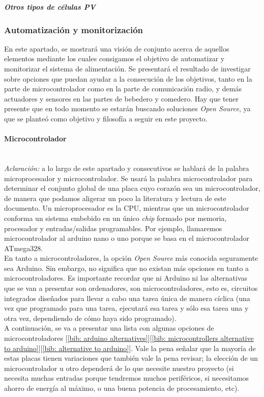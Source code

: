 \documentclass[12pt]{article}
\newcommand{\subsubsubsection}[1]{\paragraph{#1}\mbox{}\\}
\begin{document}
	\noindent \textit{\textbf{Otros tipos de células PV}} \\
	
	\subsubsection{Automatización y monitorización}
	\label{subsección 3.2.2: automatización y monitorización}
	
	\noindent En este apartado, se mostrará una visión de conjunto acerca de aquellos elementos mediante los cuales consigamos el objetivo de automatizar y monitorizar el sistema de alimentación. Se presentará el resultado de investigar sobre opciones que puedan ayudar a la consecución de los objetivos, tanto en la parte de microcontrolador como en la parte de comunicación radio, y demás actuadores y sensores en las partes de bebedero y comedero. Hay que tener presente que en todo momento se estarán buscando soluciones \textit{Open Source}, ya que se planteó como objetivo y filosofía a seguir en este proyecto.\\
	
	\subsubsubsection{Microcontrolador}
	
	\noindent \textit{Aclaración:} a lo largo de este apartado y consecutivos se hablará de la palabra microprocesador y microcontrolador. Se usará la palabra microcontrolador para determinar el conjunto global de una placa cuyo corazón sea un microcontrolador, de manera que podamos aligerar un poco la literatura y lectura de este documento. Un microprocesador es la CPU, mientras que un microcontrolador conforma un sistema embebido en un único \textit{chip} formado por memoria, procesador y entradas/salidas programables. Por ejemplo, llamaremos microcontrolador al arduino nano o uno porque se basa en el microcontrolador ATmega328.\\
	
	\noindent En tanto a microcontroladores, la opción \textit{Open Source} más conocida seguramente sea Arduino. Sin embargo, no significa que no existan más opciones en tanto a microcontroladores. Es importante recordar que ni Arduino ni las alternativas que se van a presentar son ordenadores, son microcontroladores, esto es, circuitos integrados diseñados para llevar a cabo una tarea única de manera cíclica (una vez que programado para una tarea, ejecutará esa tarea y sólo esa tarea una y otra vez, dependiendo de cómo haya sido programado).\\
	
	\noindent A continuación, se va a presentar una lista con algunas opciones de microcontroladores [\ref{bib: arduino alternatives}][\ref{bib: microcontrollers alternative to arduino}][\ref{bib: alternative to arduino}]. Vale la pena señalar que la mayoría de estas placas tienen variaciones que también vale la pena revisar; la elección de un microcontrolador u otro dependerá de lo que necesite nuestro proyecto (si necesita muchas entradas porque tendremos muchos periféricos, si necesitamos ahorro de energía al máximo, o una buena potencia de procesamiento, etc). \\
	
\end{document}
